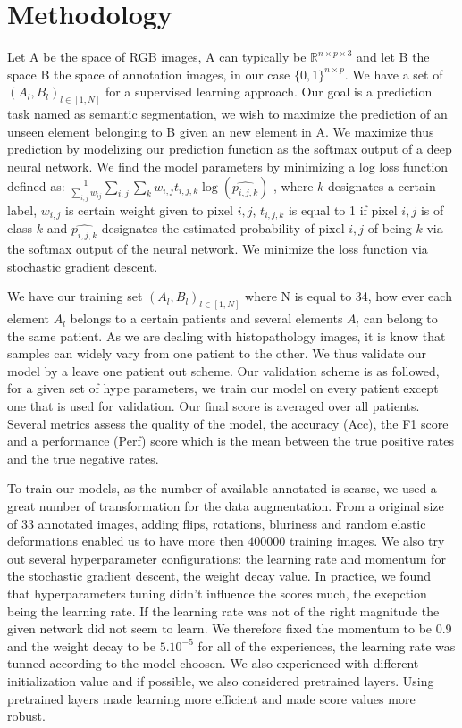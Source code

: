 \documentclass{article}
\begin{document}
\section{Methodology}
\label{sec:method}
Let A be the space of RGB images, A can typically be 
$\mathbb{R}^{n \times p \times 3}$ and let B the space B the space of annotation 
images, in our case $\{0,1\}^{n \times p}$. We have a set of 
$(A_l,B_l)_{l \in [1, N]}$ for a supervised learning approach. Our goal is 
a prediction task 
named as semantic segmentation, we wish to maximize the prediction of 
an unseen element belonging to B given an new element in A. We maximize 
thus prediction by modelizing our prediction function as the softmax output of a deep neural 
network. We find the model parameters by minimizing a log loss function 
defined as:
 $\frac{1}{\sum_{i,j}w_{ij}} \sum_{i,j} \sum_k w_{i,j} t_{i,j,k} \log (\widehat{p_{i,j,k}})$
, where $k$ designates a certain label, $w_{i,j}$ is 
certain weight given to pixel $i,j$, $t_{i,j,k}$ is equal to 1 if pixel $i,j$ is 
of class $k$ and $\widehat{p_{i,j,k}}$ designates the estimated probability 
of pixel $i,j$ of being $k$ via the softmax output of the neural network.
We minimize the loss function via stochastic gradient descent.

We have our training set $(A_l,B_l)_{l \in [1, N]}$ where N is equal to 
34, how ever each element $A_l$ belongs to a certain patients and 
several elements $A_l$ can belong to the same patient. As we are 
dealing with histopathology images, it is know that samples can widely 
vary from one patient to the other. We thus validate our model by a 
leave one patient out scheme. Our validation scheme is as followed, for a 
given set of hype parameters, we 
train our model on every patient except one that is used for validation. 
Our final score is averaged over all patients.
Several metrics assess the quality of the model, the accuracy (Acc), the 
F1 score and a performance (Perf) score which is the mean between the 
true positive rates and the true negative rates.

To train our models, as the number of available annotated is scarse, we 
used a great number of transformation for the data augmentation. From 
a original size of 33 annotated images, adding flips, rotations, bluriness 
and random elastic deformations enabled us to have more then 
$400 000$ training images. 
We also try out several hyperparameter configurations: the learning rate and 
momentum for the stochastic gradient descent, the weight decay value.  
In practice, we found that hyperparameters tuning didn't influence the 
scores much, the exepction being the learning rate. If the learning rate 
was not of the right magnitude the given network did not seem to learn. 
We therefore fixed the momentum to be 0.9 and the weight decay to be 
$5.10^{-5}$ for all of the experiences, the learning rate was tunned 
according to the model choosen.
We also experienced with different 
initialization value and if possible, we also considered pretrained layers. 
Using pretrained layers made learning more efficient and made score 
values more robust.
\end{document}
